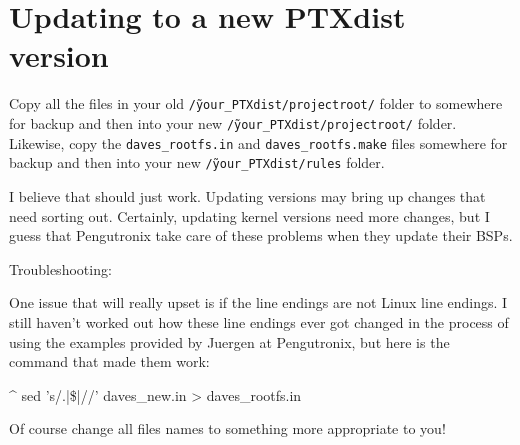 \section{Updating to a new PTXdist version}

Copy all the files in your old \texttt{\~/your\_PTXdist/projectroot/} folder to
somewhere for backup and then into your new \texttt{\~/your\_PTXdist/projectroot/}
folder. Likewise, copy the \texttt{daves\_rootfs.in} and \texttt{daves\_rootfs.make}
files somewhere for backup and then into your new \texttt{\~/your\_PTXdist/rules}
folder.

I believe that should just work. Updating \ptxdist{} versions may bring up
changes that need sorting out. Certainly, updating kernel versions need more
changes, but I guess that Pengutronix take care of these problems when they
update their BSPs.

Troubleshooting:

One issue that will really upset \ptxdist{} is if the line endings are not
Linux line endings. I still haven't worked out how these line endings ever got
changed in the process of using the examples provided by Juergen at Pengutronix,
but here is the command that made them work:

\begin{ptxshell}[escapechar=|]{^}
sed 's/.|\$|//' daves_new.in > daves_rootfs.in
\end{ptxshell}

Of course change all files names to something more appropriate to you!
